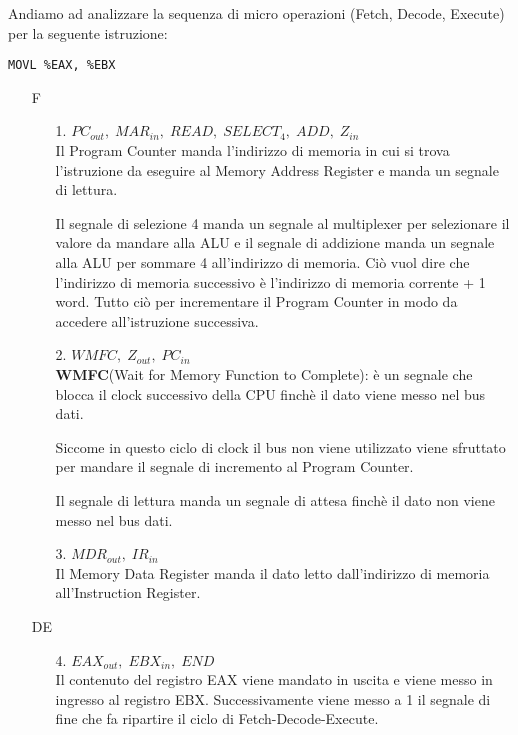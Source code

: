 \documentclass[a4paper]{article}
\theoremstyle{break}
\theoremstyle{break}
\theoremstyle{break}
\theoremstyle{break}
\begin{document}
\begin{example}
	Andiamo ad analizzare la sequenza di micro operazioni (Fetch, Decode, Execute) per la
	seguente istruzione:
	\begin{center}
		\texttt{MOVL \%EAX, \%EBX}
	\end{center}

	\begin{enumerate}
		\item[F]
		      \begin{enumerate}
			      \item[1.] \( PC_{out},\; MAR_{in},\; READ ,\; SELECT_4,\; ADD,\; Z_{in}\) \\
			            Il Program Counter manda l'indirizzo di memoria in cui si trova l'istruzione da eseguire
			            al Memory Address Register e manda un segnale di lettura.

			            Il segnale di selezione 4 manda un segnale al multiplexer per selezionare il valore
			            da mandare alla ALU e il segnale di addizione manda un segnale alla ALU per sommare
			            4 all'indirizzo di memoria. Ciò vuol dire che l'indirizzo di memoria successivo è
			            l'indirizzo di memoria corrente + 1 word. Tutto ciò per incrementare il Program
			            Counter in modo da accedere all'istruzione successiva.

			      \item[2.] \( WMFC,\; Z_{out},\; PC_{in}\)  \\
			            \textbf{WMFC}(Wait for Memory Function to Complete): è un segnale che blocca il clock
			            successivo della CPU finchè il dato viene messo nel bus dati.

			            Siccome in questo ciclo di clock il bus non viene utilizzato viene sfruttato per
			            mandare il segnale di incremento al Program Counter.

			            Il segnale di lettura manda un segnale di attesa finchè il dato non viene messo nel bus dati.
			      \item[3.] \( MDR_{out},\; IR_{in} \) \\
			            Il Memory Data Register manda il dato letto dall'indirizzo di memoria all'Instruction Register.
		      \end{enumerate}

		\item[DE]
		      \begin{enumerate}
			      \item[4.] \( EAX_{out},\; EBX_{in},\; END \) \\
			            Il contenuto del registro EAX viene mandato in uscita e viene messo in ingresso
			            al registro EBX. Successivamente viene messo a 1 il segnale di fine che fa
			            ripartire il ciclo di Fetch-Decode-Execute.
		      \end{enumerate}
	\end{enumerate}
\end{example}
\begin{figure}[H]

\end{figure}
\end{document}

